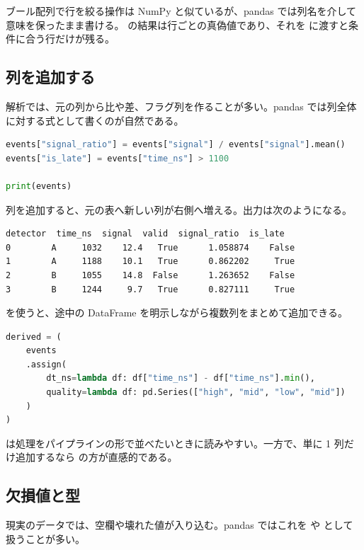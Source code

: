 ブール配列で行を絞る操作は NumPy と似ているが、pandas では列名を介して意味を保ったまま書ける。 の結果は行ごとの真偽値であり、それを  に渡すと条件に合う行だけが残る。

\subsection{列を追加する}

解析では、元の列から比や差、フラグ列を作ることが多い。pandas では列全体に対する式として書くのが自然である。

\begin{lstlisting}[language=Python]
events["signal_ratio"] = events["signal"] / events["signal"].mean()
events["is_late"] = events["time_ns"] > 1100

print(events)
\end{lstlisting}

列を追加すると、元の表へ新しい列が右側へ増える。出力は次のようになる。

\begin{lstlisting}[numbers=none, xleftmargin=2\zw]
  detector  time_ns  signal  valid  signal_ratio  is_late
0        A     1032    12.4   True      1.058874    False
1        A     1188    10.1   True      0.862202     True
2        B     1055    14.8  False      1.263652    False
3        B     1244     9.7   True      0.827111     True
\end{lstlisting}

 を使うと、途中の DataFrame を明示しながら複数列をまとめて追加できる。

\begin{lstlisting}[language=Python]
derived = (
    events
    .assign(
        dt_ns=lambda df: df["time_ns"] - df["time_ns"].min(),
        quality=lambda df: pd.Series(["high", "mid", "low", "mid"])
    )
)
\end{lstlisting}

 は処理をパイプラインの形で並べたいときに読みやすい。一方で、単に 1 列だけ追加するなら  の方が直感的である。

\subsection{欠損値と型}

現実のデータでは、空欄や壊れた値が入り込む。pandas ではこれを  や  として扱うことが多い。

